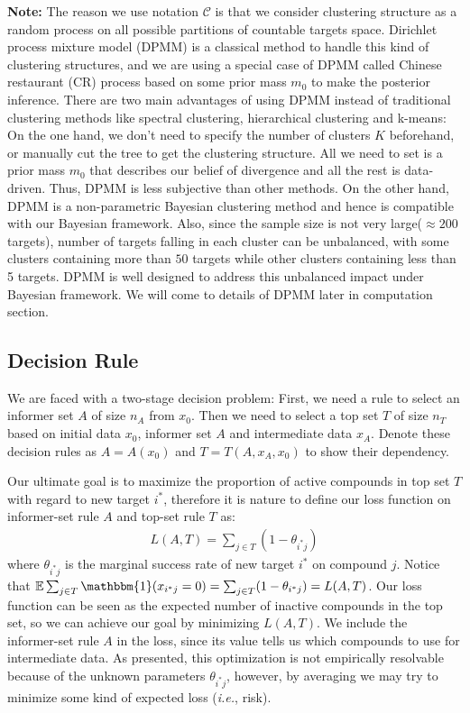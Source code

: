 \documentclass[12pt]{article}
\begin{document}
\textbf{Note:} The reason we use notation $\mathcal{C}$ is that we consider clustering structure as a random process on all possible partitions of countable targets space. Dirichlet process mixture model (DPMM) is a classical method to handle this kind of clustering structures, and we are using a special case of DPMM called Chinese restaurant (CR) process based on some prior mass
$m_0$ to make the posterior inference. There are two main advantages of using DPMM instead of traditional clustering methods like spectral clustering, hierarchical clustering and k-means: On the one hand, we don't need to specify the number of clusters $K$ beforehand, or manually cut the tree to get the clustering structure. All we need to set is a prior mass $m_0$ that describes our belief of divergence and all the rest is data-driven. Thus, DPMM is less subjective than other methods. On the other hand, DPMM is a non-parametric Bayesian clustering method and hence is compatible with our Bayesian framework. Also, since the sample size is not very large($\approx 200$ targets), number of targets falling in each cluster can be unbalanced, with some clusters containing more than $50$ targets while other clusters containing less than 5 targets. DPMM is well designed to address this unbalanced impact under Bayesian framework. We will come to details of DPMM later in computation section. 



\subsection{Decision Rule}

We are faced with a two-stage decision problem: First, we need a rule to select an informer set $A$ of size $n_A$ from $x_0$. Then we need to select a top set $T$ of size $n_T$ based on initial data $x_0$, informer set $A$ and intermediate data $x_A$. Denote these decision rules as $A = A(x_0)$ and $T = T(A,x_A,x_0)$ to show their dependency. 

Our ultimate goal is to maximize the proportion of active compounds in top set $T$ with regard to new target $i^*$, therefore it is nature to define our loss function on informer-set rule $A$ and top-set rule $T$ as:
\begin{eqnarray}
\label{eq:loss}
L(A, T) = \sum_{j \in T} \left( 1- \theta_{i^*j} \right)
\end{eqnarray}
where $\theta_{i^*j}$ is the marginal success rate of new target $i^*$ on compound $j$. Notice that $\mathbb E\sum_{j\in T}\mathbbm{1}(x_{i^*j}=0) = \sum_{j \in T} ( 1- \theta_{i^*j} ) = L(A,T)$. Our loss function can be seen as the expected number of inactive compounds in the top set, so  we can achieve our goal by minimizing $L(A, T)$.  We include the informer-set rule $A$ in the loss, since
its value tells us which compounds to use for intermediate data.  As presented,
this optimization is not
empirically resolvable because of the unknown parameters $\theta_{i^*j}$, however, by averaging we may try to minimize some kind
of expected loss ({\em i.e.}, risk).
\end{document}
